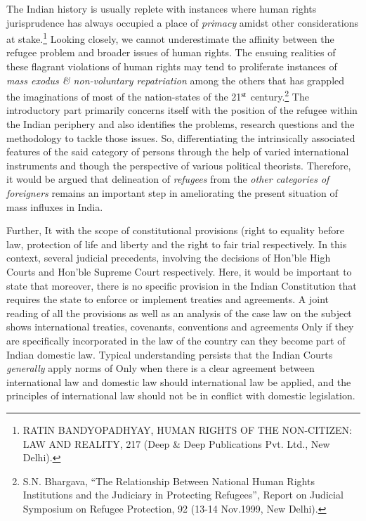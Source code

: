 \begin{multicols}{2}
\noi
The Indian history is usually replete with instances where human rights jurisprudence has
always occupied a place of \textit{primacy} amidst other considerations at stake.\footnote{RATIN BANDYOPADHYAY, HUMAN RIGHTS OF THE NON-CITIZEN: LAW AND REALITY, 217 (Deep \& Deep Publications Pvt. Ltd., New Delhi).} Looking closely, we cannot underestimate the affinity between the refugee problem and broader issues of human rights. The ensuing realities of these flagrant violations of human rights may tend to
proliferate instances of \textit{mass exodus \& non-voluntary repatriation} among the others that has
grappled the imaginations of most of the nation-states of the 21$^{\rm st}$ century.\footnote{S.N. Bhargava, “The Relationship Between National Human Rights Institutions and the Judiciary in Protecting Refugees”, Report on Judicial Symposium on Refugee Protection, 92 (13-14 Nov.1999, New Delhi).} The introductory
part primarily concerns itself with the position of the refugee within the Indian periphery and
also identifies the problems, research questions and the methodology to tackle those issues.
So, differentiating the intrinsically associated features of the said category of persons through
the help of varied international instruments and though the perspective of various political
theorists. Therefore, it would be argued that delineation of \textit{refugees} from the \textit{other categories
of foreigners} remains an important step in ameliorating the present situation of mass influxes
in India.

\vspace{-.15cm}

\noi
Further, It with the scope of constitutional provisions (right to equality before law, protection
of life and liberty and the right to fair trial respectively. In this context, several judicial
precedents, involving the decisions of Hon’ble High Courts and Hon’ble Supreme Court
respectively. Here, it would be important to state that moreover, there is no specific provision
in the Indian Constitution that requires the state to enforce or implement treaties and
agreements. A joint reading of all the provisions as well as an analysis of the case law on the
subject shows international treaties, covenants, conventions and agreements Only if they are
specifically incorporated in the law of the country can they become part of Indian domestic
law. Typical understanding persists that the Indian Courts \textit{generally} apply norms of Only
when there is a clear agreement between international law and domestic law should
international law be applied, and the principles of international law should not be in conflict
with domestic legislation.


\end{multicols}
